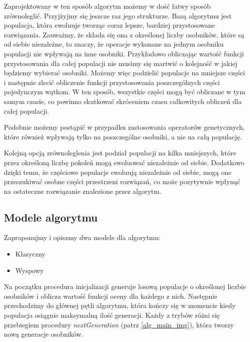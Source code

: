 Zaprojektowany w ten sposób algorytm możemy w dość łatwy sposób zrównoleglić. Przyjżyjmy się jeszcze raz jego strukturze. Bazą algorytmu jest 
populacja, która ewoluuje tworząc coraz lepsze, bardziej przystosowane rozwiązania. Zauważmy, że składa się ona z określonej liczby osobników, 
które są od siebie niezależne, to znaczy, że operacje wykonane na jednym osobniku populacji nie wpływają na inne osobniki. Przykładowo 
obliczając wartość funkcji przystosowania dla całej populacji nie musimy się martwić o kolejność w jakiej będziemy wybierać osobniki. Możemy więc 
podzielić populacje na mniejsze części i następnie zlecić obliczenie funkcji przystosowania poszczególnych części pojedynczym wątkom. W ten 
sposób, wszystkie części mogą być obliczane w tym samym czasie, co powinno skutkować skróceniem czasu całkowitych obliczeń dla całej populacji.

Podobnie możemy postąpić w przypadku zastosowania operatorów genetycznych, które również wpływają tylko na poszczególne osobniki, a nie na całą 
populację.

Kolejną opcją zrównoleglenia jest podział populacji na kilka mniejszych, które przez określoną liczbę pokoleń mogą ewoluować niezależnie 
od siebie. Dodatkowo dzięki temu, że częściowe populacje ewoluują niezależnie od siebie, mogą one przeszukiwać osobne części przestrzeni 
rozwiązań, co może pozytywnie wpłynąć na ostateczne rozwiązanie znalezione przez algorytm\cite{ISLAND-MODEL-PERFORMANCE}.


\subsection{Modele algorytmu}

Zaproponujmy i opiszmy dwa modele dla algorytmu:
\begin{itemize}
    \item Klasyczny
    \item Wyspowy
\end{itemize}

Na początku procedura inicjalizacji generuje losową populacje o określonej liczbie osobników i oblicza wartość funkcji oceny dla każdego z nich. 
Następnie przechodzimy do głównej pętli algorytmu, która kończy się w momencie kiedy populacja osiągnie maksymalną ilość generacji. 
Każdy z trybów różni się przebiegiem procedury \textit{nextGeneration} (patrz \ref{alg_main_img}), która tworzy nową generacje osobników.

\newpage

